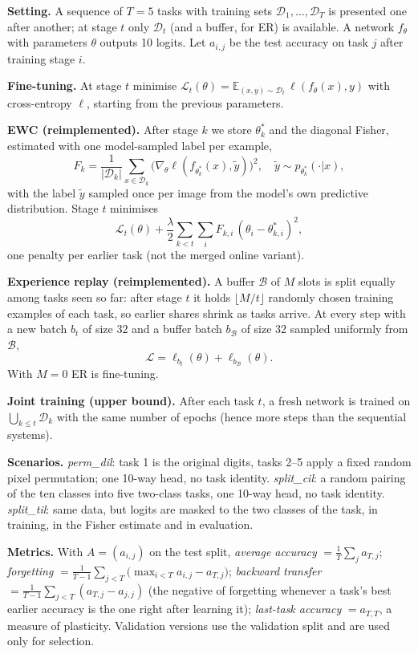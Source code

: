 \textbf{Setting.} A sequence of $T{=}5$ tasks with training sets $\mathcal D_1,\dots,\mathcal D_T$ is presented one after another; at stage $t$ only $\mathcal D_t$ (and a buffer, for ER) is available. A network $f_\theta$ with parameters $\theta$ outputs 10 logits. Let $a_{i,j}$ be the test accuracy on task $j$ after training stage $i$.

\textbf{Fine-tuning.} At stage $t$ minimise $\mathcal L_t(\theta)=\mathbb E_{(x,y)\sim\mathcal D_t}\,\ell(f_\theta(x),y)$ with cross-entropy $\ell$, starting from the previous parameters.

\textbf{EWC (reimplemented).} After stage $k$ we store $\theta^*_k$ and the diagonal Fisher, estimated with one model-sampled label per example,
\begin{equation}
F_{k}=\frac1{|\mathcal D_k|}\sum_{x\in\mathcal D_k}\big(\nabla_\theta \ell(f_{\theta^*_k}(x),\tilde y)\big)^{2},\quad \tilde y\sim p_{\theta^*_k}(\cdot|x),
\end{equation}
with the label $\tilde y$ sampled once per image from the model's own predictive distribution. Stage $t$ minimises
\begin{equation}
\mathcal L_t(\theta)+\frac{\lambda}{2}\sum_{k<t}\sum_i F_{k,i}\,(\theta_i-\theta^*_{k,i})^2,
\end{equation}
one penalty per earlier task (not the merged online variant).

\textbf{Experience replay (reimplemented).} A buffer $\mathcal B$ of $M$ slots is split equally among tasks seen so far: after stage $t$ it holds $\lfloor M/t\rfloor$ randomly chosen training examples of each task, so earlier shares shrink as tasks arrive. At every step with a new batch $b_t$ of size 32 and a buffer batch $b_{\mathcal B}$ of size 32 sampled uniformly from $\mathcal B$,
\begin{equation}
\mathcal L=\ell_{b_t}(\theta)+\ell_{b_{\mathcal B}}(\theta).
\end{equation}
With $M{=}0$ ER is fine-tuning.

\textbf{Joint training (upper bound).} After each task $t$, a fresh network is trained on $\bigcup_{k\le t}\mathcal D_k$ with the same number of epochs (hence more steps than the sequential systems).

\textbf{Scenarios.} \emph{perm\_dil}: task 1 is the original digits, tasks 2--5 apply a fixed random pixel permutation; one 10-way head, no task identity. \emph{split\_cil}: a random pairing of the ten classes into five two-class tasks, one 10-way head, no task identity. \emph{split\_til}: same data, but logits are masked to the two classes of the task, in training, in the Fisher estimate and in evaluation.

\textbf{Metrics.} With $A=(a_{i,j})$ on the test split, \emph{average accuracy} $=\frac1T\sum_j a_{T,j}$; \emph{forgetting} $=\frac1{T-1}\sum_{j<T}\big(\max_{i<T}a_{i,j}-a_{T,j}\big)$; \emph{backward transfer} $=\frac1{T-1}\sum_{j<T}(a_{T,j}-a_{j,j})$ (the negative of forgetting whenever a task's best earlier accuracy is the one right after learning it); \emph{last-task accuracy} $=a_{T,T}$, a measure of plasticity. Validation versions use the validation split and are used only for selection.
